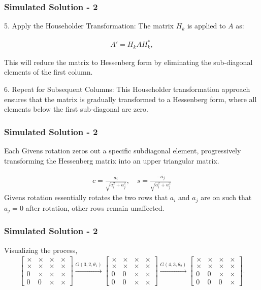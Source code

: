 \documentclass{beamer}
\theoremstyle{remark}
\numberwithin{equation}{section}
\begin{document}
\begin{frame}
	\frametitle{Simulated Solution - 2}
5. Apply the Householder Transformation:
	The matrix \( H_k \) is applied to \( A \) as:

		\begin{align}
		A' = H_k A H_k^*,
		\end{align}

	This will reduce the matrix to Hessenberg form by eliminating the sub-diagonal elements of the first column.

6. Repeat for Subsequent Columns:
	This Householder transformation approach ensures that the matrix is gradually transformed to a Hessenberg form, where all elements below the first sub-diagonal are zero.

\end{frame}
\begin{frame}
	\frametitle{Simulated Solution - 2}
	Each Givens rotation zeros out a specific subdiagonal element, progressively transforming the Hessenberg matrix into an upper triangular matrix.

	\begin{align}
		c = \frac{\overline{a_{i}}}{\sqrt{a_{i}^2 + a_{j}^2}}, \quad s = \frac{-\overline{a_{j}}}{\sqrt{a_{i}^2 + a_{j}^2}}
	\end{align}
	Givens rotation essentially rotates the two rows that $a_i$ and $a_j$ are on such that $a_j = 0$ after rotation, other rows remain unaffected.\\ 
\end{frame}
\begin{frame}
	\frametitle{Simulated Solution - 2}
	Visualizing the process,
	\begin{align}
		\begin{bmatrix}
			\times & \times & \times & \times \\
			\times & \times & \times & \times \\
			0 & \times & \times & \times \\
			0 & 0 & \times & \times
		\end{bmatrix}
		\xrightarrow{G(3,2,\theta_1)}
		\begin{bmatrix}
			\times & \times & \times & \times \\
			\times & \times & \times & \times \\
			0 & 0 & \times & \times \\
			0 & 0 & \times & \times
		\end{bmatrix}
		\xrightarrow{G(4,3,\theta_2)}
		\begin{bmatrix}
			\times & \times & \times & \times \\
			\times & \times & \times & \times \\
			0 & 0 & \times & \times \\
			0 & 0 & 0 & \times
		\end{bmatrix}.
	\end{align}
\end{frame}
\end{document}
